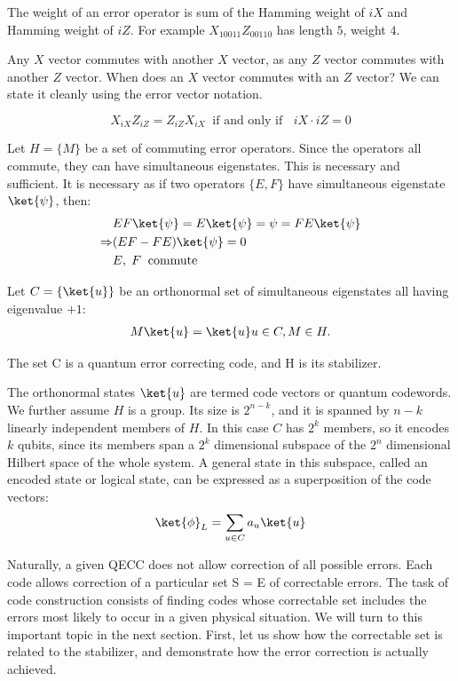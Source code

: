 The weight of an error operator is sum of the Hamming weight of \(iX\) and Hamming weight of \(iZ\). For example \(X_{10011}Z_{00110}\) has length \(5\), weight \(4\).

Any \(X\) vector commutes with another \(X\) vector, as any \(Z\) vector commutes with another \(Z\) vector. When does an \(X\) vector commutes with an \(Z\) vector? We can state it cleanly using the error vector notation. 
\begin{lemma}
    \[X_{iX} Z_{iZ} = Z_{iZ} X_{iX} \;\; \text{if and only if }\;\; iX\cdot iZ = 0\]
    \label{lemma:Stable}
\end{lemma}

Let \(H = \{M\}\) be a set of commuting error operators. Since the operators all commute, they can have simultaneous eigenstates. This is necessary and sufficient. It is necessary as if two operators \(\{E, F\}\) have simultaneous eigenstate \(\ket{\psi}\), then:
\begin{align*}
    & EF\ket{\psi} = E\ket{\psi} = \psi = FE\ket{\psi} \\
 \Rightarrow & (EF-FE)\ket{\psi} = 0 \\
    & E,\; F \;\; \text{commute}
\end{align*}


Let \(C = \{\ket{u}\}\) be an orthonormal set of simultaneous eigenstates all having eigenvalue \(+1\):
\begin{align*}
M\ket{u}=\ket{u}  u \in C,  M \in H.    
\end{align*}

The set C is a quantum error correcting code, and H is its stabilizer. 

The orthonormal states \(\ket{u}\) are termed code vectors or quantum codewords. We further assume \(H\) is a group. Its size is \(2^{n-k}\), and it is spanned by \(n-k\) linearly independent members of \(H\). In this case \(C\) has \(2^k\) members, so it encodes \(k\) qubits, 
since its members span a \(2^k\) dimensional subspace of the \(2^n\)
dimensional Hilbert space of the whole system. A general state in this subspace, called an encoded state or logical state, can be expressed as a superposition of the code vectors:
\begin{align*}
\ket{\phi}_L = \sum_{u \in C} a_u \ket{u}    
\end{align*}


Naturally, a given QECC does not allow correction of all possible errors. Each code allows correction of a particular set S = {E} of correctable errors. The task of code construction consists of finding codes whose correctable set includes the errors most likely to occur in a given physical situation. We will turn to this important topic in the next section. First, let us show how the correctable set is related to the stabilizer, and demonstrate how the error correction is actually achieved.

